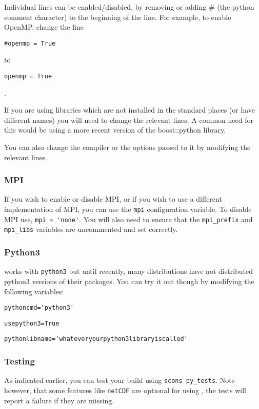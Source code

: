 Individual lines can be enabled/disabled, by removing or adding \# (the python comment character) to the beginning of the line.
For example, to enable OpenMP, change the line
\begin{verbatim}
#openmp = True 
\end{verbatim}
to
\begin{verbatim}
openmp = True 
\end{verbatim}.

If you are using libraries which are not installed in the standard places (or have different names) you will need to 
change the relevant lines.
A common need for this would be using a more recent version of the boost::python library.

You can also change the compiler or the options passed to it by modifying the relevant lines.

\subsubsection*{MPI}
If you wish to enable or disable MPI, or if you wish to use a different implementation of MPI, you can use the \texttt{mpi}
configuration variable.
To disable MPI use, \verb|mpi = 'none'|.
You will also need to ensure that the \texttt{mpi_prefix} and \texttt{mpi_libs} variables are uncommented and set correctly.

\subsubsection{Python3}
\escript works with \texttt{python3} but until recently, many distributions have not distributed python3 versions of their packages.
You can try it out though by modifying the following variables:

\begin{verbatim}
pythoncmd='python3'
\end{verbatim}

\begin{verbatim}
usepython3=True
\end{verbatim}

\begin{verbatim}
pythonlibname='whateveryourpython3libraryiscalled'
\end{verbatim}




\subsubsection{Testing}
As indicated earlier, you can test your build using \texttt{scons py_tests}.
Note however, that some features like \texttt{netCDF} are optional for using \escript, the tests will report a failure if
they are missing.

